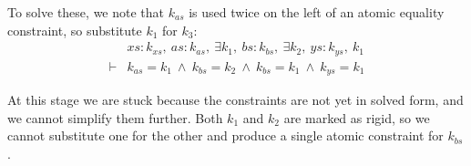 To solve these, we note that $k_{as}$ is used twice on the left of an atomic equality constraint, so substitute $k_1$ for $k_3$:
$$
\begin{array}{ll}
       & xs : k_{xs},~ as : k_{as},~ \exists k_1,~ bs : k_{bs},~ \exists k_2,~ ys : k_{ys},~ k_1
\\
\vdash &          k_{as}   = k_1
        ~\wedge~  k_{bs}   = k_2
        ~\wedge~  k_{bs}   = k_1
        ~\wedge~  k_{ys}   = k_1
\end{array}
$$

At this stage we are stuck because the constraints are not yet in solved form, and we cannot simplify them further. Both $k_1$ and $k_2$ are marked as rigid, so we cannot substitute one for the other and produce a single atomic constraint for $k_{bs}$.


% 


